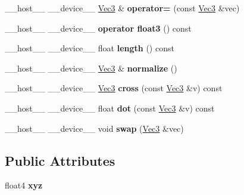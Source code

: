 \begin{DoxyCompactItemize}
\item 
\+\_\+\+\_\+host\+\_\+\+\_\+ \+\_\+\+\_\+device\+\_\+\+\_\+ \hyperlink{class_vec3}{Vec3} \& {\bfseries operator=} (const \hyperlink{class_vec3}{Vec3} \&vec)\hypertarget{class_vec3_abd0c90cf6cc28577248e9ae86d72d5a9}{}\label{class_vec3_abd0c90cf6cc28577248e9ae86d72d5a9}

\item 
\+\_\+\+\_\+host\+\_\+\+\_\+ \+\_\+\+\_\+device\+\_\+\+\_\+ {\bfseries operator float3} () const\hypertarget{class_vec3_afa3f84872dfa8c04bed556854730e6a9}{}\label{class_vec3_afa3f84872dfa8c04bed556854730e6a9}

\item 
\+\_\+\+\_\+host\+\_\+\+\_\+ \+\_\+\+\_\+device\+\_\+\+\_\+ float {\bfseries length} () const\hypertarget{class_vec3_a12cbc93353a9dc6c9ea5e4b2977fc865}{}\label{class_vec3_a12cbc93353a9dc6c9ea5e4b2977fc865}

\item 
\+\_\+\+\_\+host\+\_\+\+\_\+ \+\_\+\+\_\+device\+\_\+\+\_\+ \hyperlink{class_vec3}{Vec3} \& {\bfseries normalize} ()\hypertarget{class_vec3_aaeb17c15d3cbdc7e3d8981b7f0f49b51}{}\label{class_vec3_aaeb17c15d3cbdc7e3d8981b7f0f49b51}

\item 
\+\_\+\+\_\+host\+\_\+\+\_\+ \+\_\+\+\_\+device\+\_\+\+\_\+ \hyperlink{class_vec3}{Vec3} {\bfseries cross} (const \hyperlink{class_vec3}{Vec3} \&v) const\hypertarget{class_vec3_a7dbe7c404cdda8d7f40c398b2fd2eeba}{}\label{class_vec3_a7dbe7c404cdda8d7f40c398b2fd2eeba}

\item 
\+\_\+\+\_\+host\+\_\+\+\_\+ \+\_\+\+\_\+device\+\_\+\+\_\+ float {\bfseries dot} (const \hyperlink{class_vec3}{Vec3} \&v) const\hypertarget{class_vec3_aabc0167d8027104b5b9d7380cdda9b66}{}\label{class_vec3_aabc0167d8027104b5b9d7380cdda9b66}

\item 
\+\_\+\+\_\+host\+\_\+\+\_\+ \+\_\+\+\_\+device\+\_\+\+\_\+ void {\bfseries swap} (\hyperlink{class_vec3}{Vec3} \&vec)\hypertarget{class_vec3_a03632ba5412c9f2048004e2f208d7bb4}{}\label{class_vec3_a03632ba5412c9f2048004e2f208d7bb4}

\end{DoxyCompactItemize}
\subsection*{Public Attributes}
\begin{DoxyCompactItemize}
\item 
float4 {\bfseries xyz}\hypertarget{class_vec3_a1eaa5d966de592d952b54b363987150f}{}\label{class_vec3_a1eaa5d966de592d952b54b363987150f}

\end{DoxyCompactItemize}
